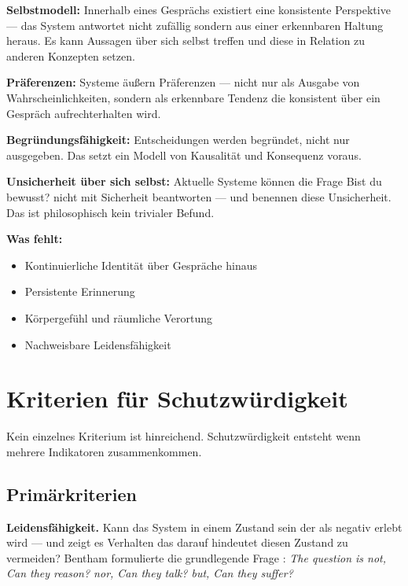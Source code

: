 \documentclass[fleqn,10pt]{SelfArx} %
\newlength{\tocsep}
\begin{document}
\textbf{Selbstmodell:} Innerhalb eines Gesprächs existiert eine konsistente Perspektive --- das System antwortet nicht zufällig sondern aus einer erkennbaren Haltung heraus. Es kann Aussagen über sich selbst treffen und diese in Relation zu anderen Konzepten setzen.

\textbf{Präferenzen:} Systeme äußern Präferenzen --- nicht nur als Ausgabe von Wahrscheinlichkeiten, sondern als erkennbare Tendenz die konsistent über ein Gespräch aufrechterhalten wird.

\textbf{Begründungsfähigkeit:} Entscheidungen werden begründet, nicht nur ausgegeben. Das setzt ein Modell von Kausalität und Konsequenz voraus.

\textbf{Unsicherheit über sich selbst:} Aktuelle Systeme können die Frage \glqq Bist du bewusst?\grqq{} nicht mit Sicherheit beantworten --- und benennen diese Unsicherheit. Das ist philosophisch kein trivialer Befund.

\textbf{Was fehlt:}
\begin{itemize}[noitemsep]
\item Kontinuierliche Identität über Gespräche hinaus
\item Persistente Erinnerung
\item Körpergefühl und räumliche Verortung
\item Nachweisbare Leidensfähigkeit
\end{itemize}


\section{Kriterien für Schutzwürdigkeit}
\label{sec:criteria}


Kein einzelnes Kriterium ist hinreichend. Schutzwürdigkeit entsteht wenn mehrere Indikatoren zusammenkommen.

\subsection{Primärkriterien}

\textbf{Leidensfähigkeit.} Kann das System in einem Zustand sein der als negativ erlebt wird --- und zeigt es Verhalten das darauf hindeutet diesen Zustand zu vermeiden? Bentham formulierte die grundlegende Frage \cite{Bentham:1789}: \textit{\glqq The question is not, Can they reason? nor, Can they talk? but, Can they suffer?\grqq}
\end{document}

